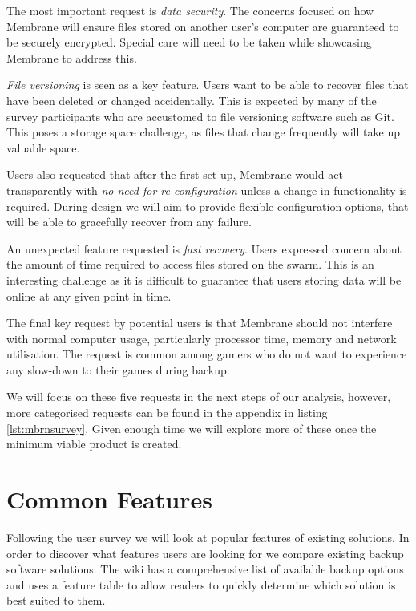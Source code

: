 \documentclass[11pt, a4paper, twoside]{report}
\begin{document}
The most important request is \emph{data security}. The concerns focused on how Membrane will ensure files stored on another user's computer are guaranteed to be securely encrypted. Special care will need to be taken while showcasing Membrane to address this.

\emph{File versioning} is seen as a key feature. Users want to be able to recover files that have been deleted or changed accidentally. This is expected by many of the survey participants who are accustomed to file versioning software such as Git. This poses a storage space challenge, as files that change frequently will take up valuable space.

Users also requested that after the first set-up, Membrane would act transparently with \emph{no need for re-configuration} unless a change in functionality is required. During design we will aim to provide flexible configuration options, that will be able to gracefully recover from any failure.

An unexpected feature requested is \emph{fast recovery}. Users expressed concern about the amount of time required to access files stored on the swarm. This is an interesting challenge as it is difficult to guarantee that users storing data will be online at any given point in time.

The final key request by potential users is that Membrane should not interfere with normal computer usage, particularly processor time, memory and network utilisation. The request is common among gamers who do not want to experience any slow-down to their games during backup.

We will focus on these five requests in the next steps of our analysis, however, more categorised requests can be found in the appendix in listing \ref{lst:mbrnsurvey}. Given enough time we will explore more of these once the minimum viable product is created.

\section{Common Features} \label{sec:commonfeatures}

Following the user survey we will look at popular features of existing solutions. In order to discover what features users are looking for we compare existing backup software solutions. The \cite{arch2017syncandbackup} wiki has a comprehensive list of available backup options and uses a feature table to allow readers to quickly determine which solution is best suited to them.
\end{document}
